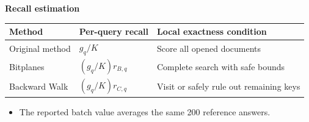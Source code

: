 \textbf{Recall estimation}\par
{\small\noindent
\begin{tabularx}{\linewidth}{@{}lYY@{}}\toprule
Method & Per-query recall & Local exactness condition\\\midrule
Original method & $g_q/K$ & Score all opened documents\\
Bitplanes & $(g_q/K)r_{B,q}$ & Complete search with safe bounds\\
Backward Walk & $(g_q/K)r_{C,q}$ & Visit or safely rule out remaining keys\\\bottomrule
\end{tabularx}\par}
\begin{itemize}
\item The reported batch value averages the same 200 reference answers.
\end{itemize}
